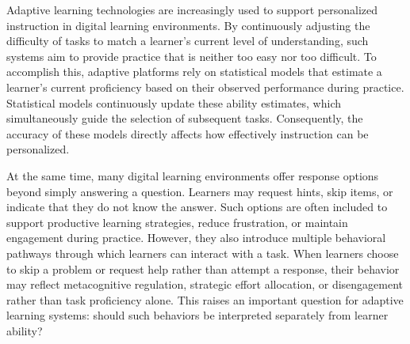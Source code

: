 \documentclass[11pt]{article}
\begin{document}


Adaptive learning technologies are increasingly used to support personalized instruction in digital learning environments. By continuously adjusting the difficulty of tasks to match a learner's current level of understanding, such systems aim to provide practice that is neither too easy nor too difficult. To accomplish this, adaptive platforms rely on statistical models that estimate a learner's current proficiency based on their observed performance during practice. Statistical models continuously update these ability estimates, which simultaneously guide the selection of subsequent tasks. Consequently, the accuracy of these models directly affects how effectively instruction can be personalized.

At the same time, many digital learning environments offer response options beyond simply answering a question. Learners may request hints, skip items, or indicate that they do not know the answer. Such options are often included to support productive learning strategies, reduce frustration, or maintain engagement during practice. However, they also introduce multiple behavioral pathways through which learners can interact with a task. When learners choose to skip a problem or request help rather than attempt a response, their behavior may reflect metacognitive regulation, strategic effort allocation, or disengagement rather than task proficiency alone. This raises an important question for adaptive learning systems: should such behaviors be interpreted separately from learner ability? 
\end{document}
